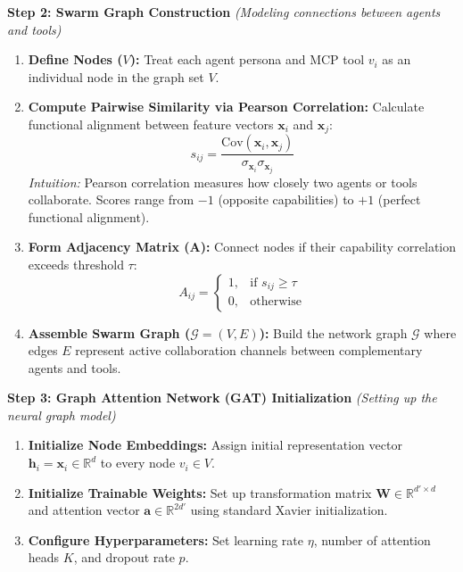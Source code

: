 \documentclass[11pt,a4paper]{article}
\begin{document}
\newpage


\textbf{Step 2: Swarm Graph Construction} \emph{(Modeling connections between agents and tools)}
\begin{enumerate}[leftmargin=1.5em, itemsep=0.25em, topsep=0.08em]
    \item \textbf{Define Nodes ($V$):} Treat each agent persona and MCP tool $v_i$ as an individual node in the graph set $V$.
    \item \textbf{Compute Pairwise Similarity via Pearson Correlation:} Calculate functional alignment between feature vectors $\mathbf{x}_i$ and $\mathbf{x}_j$:
    \[
    s_{ij} = \frac{\mathrm{Cov}(\mathbf{x}_i, \mathbf{x}_j)}{\sigma_{\mathbf{x}_i}\sigma_{\mathbf{x}_j}}
    \]
    \emph{Intuition:} Pearson correlation measures how closely two agents or tools collaborate. Scores range from $-1$ (opposite capabilities) to $+1$ (perfect functional alignment).
    \item \textbf{Form Adjacency Matrix ($\mathbf{A}$):} Connect nodes if their capability correlation exceeds threshold $\tau$:
    \[
    A_{ij} = \begin{cases} 1, & \text{if } s_{ij} \ge \tau \\ 0, & \text{otherwise} \end{cases}
    \]
    \item \textbf{Assemble Swarm Graph ($\mathcal{G} = (V, E)$):} Build the network graph $\mathcal{G}$ where edges $E$ represent active collaboration channels between complementary agents and tools.
\end{enumerate}

\vspace{0.5em}
\textbf{Step 3: Graph Attention Network (GAT) Initialization} \emph{(Setting up the neural graph model)}
\begin{enumerate}[leftmargin=1.5em, itemsep=0.25em, topsep=0.08em]
    \item \textbf{Initialize Node Embeddings:} Assign initial representation vector $\mathbf{h}_i = \mathbf{x}_i \in \mathbb{R}^d$ to every node $v_i \in V$.
    \item \textbf{Initialize Trainable Weights:} Set up transformation matrix $\mathbf{W} \in \mathbb{R}^{d' \times d}$ and attention vector $\mathbf{a} \in \mathbb{R}^{2d'}$ using standard Xavier initialization.
    \item \textbf{Configure Hyperparameters:} Set learning rate $\eta$, number of attention heads $K$, and dropout rate $p$.
\end{enumerate}
\end{document}
